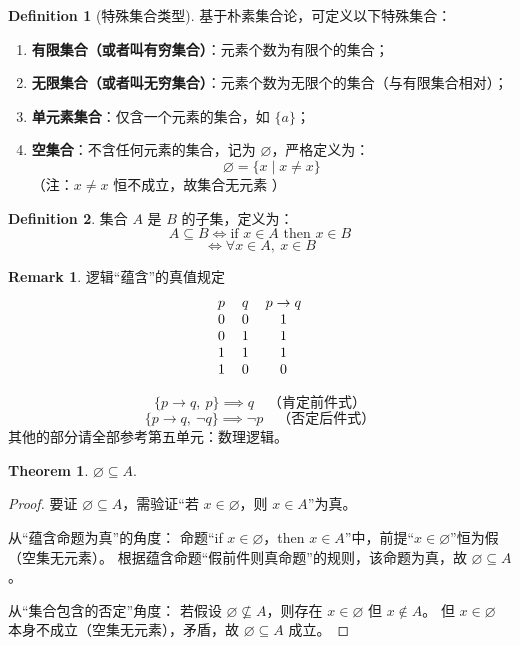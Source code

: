 \documentclass[oneside]{book}
\theoremstyle{definition}
\newtheorem{definition}{Definition}[section]
\newtheorem{theorem}{Theorem}[section]
\newtheorem{remark}{Remark}[section]
\begin{document}
	\begin{definition}[特殊集合类型]
		基于朴素集合论，可定义以下特殊集合：  
		\begin{enumerate}
			\item \textbf{有限集合（或者叫有穷集合）}：元素个数为有限个的集合；  
			\item \textbf{无限集合（或者叫无穷集合）}：元素个数为无限个的集合（与有限集合相对）；  
			\item \textbf{单元素集合}：仅含一个元素的集合，如 \( \{a\} \)；  
			\item \textbf{空集合}：不含任何元素的集合，记为 \( \varnothing \)，严格定义为：  
			\[
			\varnothing = \{ x \mid x \neq x \}
			\]  
			（注：\( x \neq x \) 恒不成立，故集合无元素 ）
		\end{enumerate}
	\end{definition}
	
	\begin{definition}集合 \( A \) 是 \( B \) 的子集，定义为：
		\[
		A \subseteq B \iff \text{if } x \in A \text{ then } x \in B
		\]
		\[
		\iff \forall x \in A,\ x \in B
		\]
	\end{definition}
	\begin{remark}   逻辑“蕴含”的真值规定
		\[\begin{tabular}{ccc}
			$p$ &$q$ &$p \to q$ \\
			0 & 0 & 1 \\
			0 & 1 & 1 \\
			1 & 1 & 1 \\
			1 & 0 & 0 \\
		\end{tabular}
		\]
	\end{remark}

		\[
		\{ p \to q,\ p \} \implies q \quad \text{（肯定前件式）}
		\]
		\[
		\{ p \to q,\ \neg q \} \implies \neg p \quad \text{（否定后件式）}
		\]
		其他的部分请全部参考第五单元：数理逻辑。
		\begin{theorem}
			\( \varnothing \subseteq A \).
		\end{theorem}
		\begin{proof}
			要证 \( \varnothing \subseteq A \)，需验证“若 \( x \in \varnothing \)，则 \( x \in A \)”为真。
			
			从“蕴含命题为真”的角度：
			命题“if \( x \in \varnothing \)，then \( x \in A \)”中，前提“\( x \in \varnothing \)”恒为假（空集无元素）。
			根据蕴含命题“假前件则真命题”的规则，该命题为真，故 \( \varnothing \subseteq A \)。
			
			从“集合包含的否定”角度：
			若假设 \( \varnothing \not\subseteq A \)，则存在 \( x \in \varnothing \) 但 \( x \notin A \)。
			但 \( x \in \varnothing \) 本身不成立（空集无元素），矛盾，故 \( \varnothing \subseteq A \) 成立。
		\end{proof}
		
\end{document}
